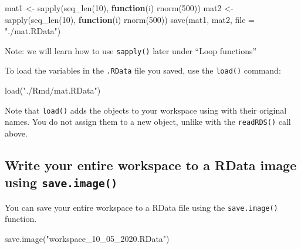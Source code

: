 \documentclass[
]{book}
\newenvironment{Shaded}{\begin{snugshade}}{\end{snugshade}}
\newcommand{\AttributeTok}[1]{\textcolor[rgb]{0.77,0.63,0.00}{#1}}
\newcommand{\ControlFlowTok}[1]{\textcolor[rgb]{0.13,0.29,0.53}{\textbf{#1}}}
\newcommand{\DecValTok}[1]{\textcolor[rgb]{0.00,0.00,0.81}{#1}}
\newcommand{\FunctionTok}[1]{\textcolor[rgb]{0.00,0.00,0.00}{#1}}
\newcommand{\NormalTok}[1]{#1}
\newcommand{\OtherTok}[1]{\textcolor[rgb]{0.56,0.35,0.01}{#1}}
\newcommand{\StringTok}[1]{\textcolor[rgb]{0.31,0.60,0.02}{#1}}
\begin{document}
\begin{Shaded}
\begin{Highlighting}[]
\NormalTok{mat1 }\OtherTok{\textless{}{-}} \FunctionTok{sapply}\NormalTok{(}\FunctionTok{seq\_len}\NormalTok{(}\DecValTok{10}\NormalTok{), }\ControlFlowTok{function}\NormalTok{(i) }\FunctionTok{rnorm}\NormalTok{(}\DecValTok{500}\NormalTok{))}
\NormalTok{mat2 }\OtherTok{\textless{}{-}} \FunctionTok{sapply}\NormalTok{(}\FunctionTok{seq\_len}\NormalTok{(}\DecValTok{10}\NormalTok{), }\ControlFlowTok{function}\NormalTok{(i) }\FunctionTok{rnorm}\NormalTok{(}\DecValTok{500}\NormalTok{))}
\FunctionTok{save}\NormalTok{(mat1, mat2, }\AttributeTok{file =} \StringTok{"./mat.RData"}\NormalTok{)}
\end{Highlighting}
\end{Shaded}

Note: we will learn how to use \texttt{sapply()} later under ``Loop functions''

To load the variables in the \texttt{.RData} file you saved, use the \texttt{load()} command:

\begin{Shaded}
\begin{Highlighting}[]
\FunctionTok{load}\NormalTok{(}\StringTok{"./Rmd/mat.RData"}\NormalTok{)}
\end{Highlighting}
\end{Shaded}

Note that \texttt{load()} adds the objects to your workspace using with their original names. You do not assign them to a new object, unlike with the \texttt{readRDS()} call above.

\hypertarget{write-your-entire-workspace-to-a-rdata-image-using-save.image}{%
\subsection{\texorpdfstring{Write your entire workspace to a RData image using \texttt{save.image()}}{Write your entire workspace to a RData image using save.image()}}\label{write-your-entire-workspace-to-a-rdata-image-using-save.image}}

You can save your entire workspace to a RData file using the \texttt{save.image()} function.

\begin{Shaded}
\begin{Highlighting}[]
\FunctionTok{save.image}\NormalTok{(}\StringTok{"workspace\_10\_05\_2020.RData"}\NormalTok{)}
\end{Highlighting}
\end{Shaded}
\end{document}
